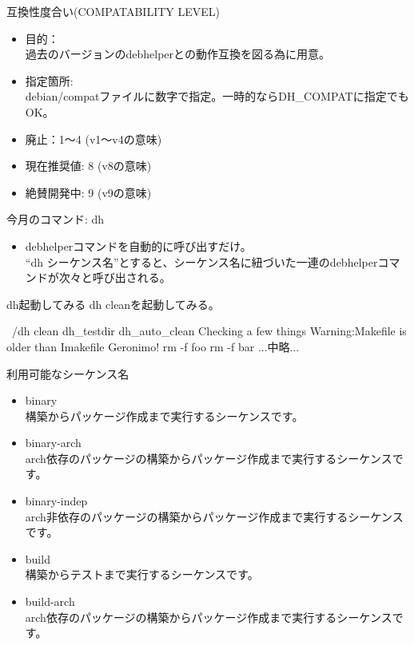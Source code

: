 \begin{frame}{互換性度合い(COMPATABILITY LEVEL)}
\begin{itemize}
\item 目的：\\
過去のバージョンのdebhelperとの動作互換を図る為に用意。
\item 指定箇所:\\
debian/compatファイルに数字で指定。一時的ならDH\_COMPATに指定でもOK。
\item 廃止：1〜4 (v1〜v4の意味)
\item 現在推奨値: 8 (v8の意味)
\item 絶賛開発中: 9 (v9の意味)
\end{itemize}
\end{frame}
\begin{frame}{今月のコマンド: dh}

\begin{itemize}
\item debhelperコマンドを自動的に呼び出すだけ。\\
``dh シーケンス名''とすると、シーケンス名に紐づいた一連のdebhelperコマンドが次々と呼び出される。
\end{itemize}
\end{frame}
\begin{frame}[containsverbatim]{dh起動してみる}
dh cleanを起動してみる。
\begin{commandline}
~/dh clean
  dh_testdir
  dh_auto_clean
Checking a few things
Warning:Makefile is older than Imakefile
Geronimo!
rm -f foo
rm -f bar
...中略...
\end{commandline}
\end{frame}
\begin{frame}{利用可能なシーケンス名}
\small
\begin{itemize}
\item binary \\
構築からパッケージ作成まで実行するシーケンスです。
\item binary-arch \\
 arch依存のパッケージの構築からパッケージ作成まで実行するシーケンスです。
\item binary-indep\\
arch非依存のパッケージの構築からパッケージ作成まで実行するシーケンスです。
\item build \\
構築からテストまで実行するシーケンスです。
\item build-arch \\
arch依存のパッケージの構築からパッケージ作成まで実行するシーケンスです。
\end{itemize}
\end{frame}
